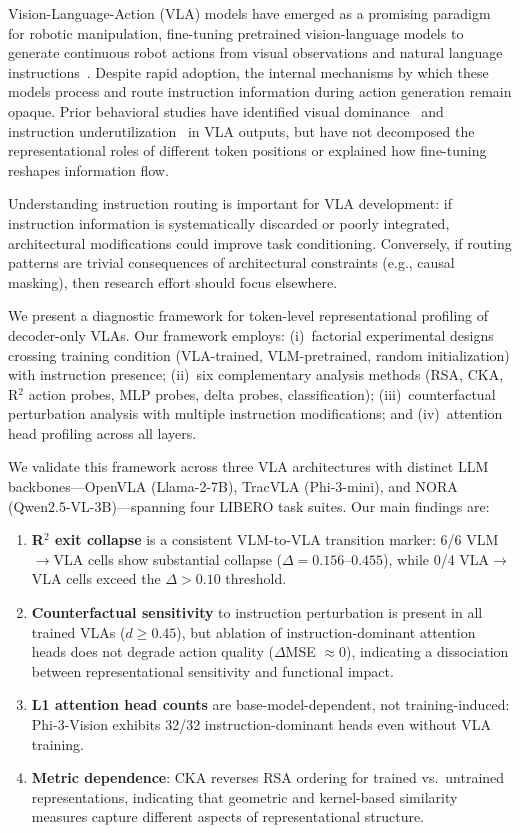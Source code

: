 \documentclass[letterpaper]{article}
\begin{document}
Vision-Language-Action (VLA) models have emerged as a promising paradigm for robotic manipulation, fine-tuning pretrained vision-language models to generate continuous robot actions from visual observations and natural language instructions~\citep{brohan2023rt2,kim2024openvla}. Despite rapid adoption, the internal mechanisms by which these models process and route instruction information during action generation remain opaque. Prior behavioral studies have identified visual dominance~\citep{grant2026visual} and instruction underutilization~\citep{haon2025instructions} in VLA outputs, but have not decomposed the representational roles of different token positions or explained how fine-tuning reshapes information flow.

Understanding instruction routing is important for VLA development: if instruction information is systematically discarded or poorly integrated, architectural modifications could improve task conditioning. Conversely, if routing patterns are trivial consequences of architectural constraints (e.g., causal masking), then research effort should focus elsewhere.

We present a diagnostic framework for token-level representational profiling of decoder-only VLAs. Our framework employs: (i)~factorial experimental designs crossing training condition (VLA-trained, VLM-pretrained, random initialization) with instruction presence; (ii)~six complementary analysis methods (RSA, CKA, R$^2$ action probes, MLP probes, delta probes, classification); (iii)~counterfactual perturbation analysis with multiple instruction modifications; and (iv)~attention head profiling across all layers.

We validate this framework across three VLA architectures with distinct LLM backbones---OpenVLA (Llama-2-7B), TracVLA (Phi-3-mini), and NORA (Qwen2.5-VL-3B)---spanning four LIBERO task suites. Our main findings are:

\begin{enumerate}[nosep]
    \item \textbf{R$^2$ exit collapse} is a consistent VLM-to-VLA transition marker: 6/6 VLM$\to$VLA cells show substantial collapse ($\Delta = 0.156$--$0.455$), while 0/4 VLA$\to$VLA cells exceed the $\Delta > 0.10$ threshold.
    \item \textbf{Counterfactual sensitivity} to instruction perturbation is present in all trained VLAs ($d \geq 0.45$), but ablation of instruction-dominant attention heads does not degrade action quality ($\Delta$MSE $\approx 0$), indicating a dissociation between representational sensitivity and functional impact.
    \item \textbf{L1 attention head counts} are base-model-dependent, not training-induced: Phi-3-Vision exhibits 32/32 instruction-dominant heads even without VLA training.
    \item \textbf{Metric dependence}: CKA reverses RSA ordering for trained vs.\ untrained representations, indicating that geometric and kernel-based similarity measures capture different aspects of representational structure.
\end{enumerate}
\end{document}
